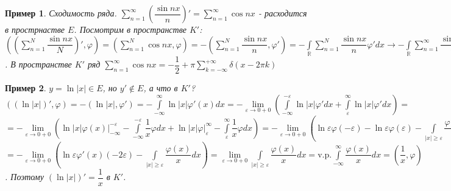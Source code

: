 \documentclass[9pt, a4paper]{article}
\newtheorem*{sample}{Пример}
\begin{document}
			\begin{sample}
				Сходимость ряда. \newline
				$\sum\limits_{n=1}^{\infty} \left(\dfrac{\sin{nx}}{n}\right)' = \sum\limits_{n=1}^{\infty}  \cos{nx}$ - расходится в прострнастве $E$. Посмотрим в пространстве $K'$: $\left(\left(\sum\limits_{n=1}^{N} \dfrac{\sin{nx}}{N}\right)', \varphi\right) = \left(\sum\limits_{n=1}^{N}  \cos{nx}, \varphi\right) = -(\sum\limits_{n=1}^N \dfrac{\sin{nx}}{n}, \varphi') = - \int\limits_{\mathbb{R}} \sum\limits_{n=1}^N \dfrac{\sin{nx}}{n} \varphi' dx  \to  - \int\limits_{\mathbb{R}} \sum\limits_{n=1}^\infty \dfrac{\sin{nx}}{n} \varphi' dx = -(f(x), \varphi'(x)) = (f'(x), \varphi)$. В пространстве $K'$ ряд $\sum\limits_{n=1}^{\infty} \cos{nx} = -\dfrac12 + \pi\sum\limits_{k=-\infty}^{+\infty} \delta(x - 2\pi k)$ 
			\end{sample}
			\begin{sample}
				$y = \ln{|x|} \in E$, но $y' \notin E$, а что в $K'$? \newline
				$((\ln{|x|})', \varphi) = -(\ln{|x|}, \varphi') = - \int\limits_{-\infty}^{\infty} \ln{|x|} \varphi'(x) dx = - \lim\limits_{\varepsilon \to 0 + 0} \left(\int\limits_{-\infty}^{-\varepsilon} \ln{|x|} \varphi' dx + \int\limits_{\varepsilon}^{\infty}  \ln{|x|} \varphi'dx \right) = $ \newline
				$=  - \lim\limits_{\varepsilon \to 0 + 0} \left(\ln{|x|}\varphi(x) \vert_{-\infty}^{-\varepsilon} - \int\limits_{-\infty}^{-\varepsilon} \dfrac{1}{x} \varphi dx + \ln{|x|}\varphi\vert_{\varepsilon}^{\infty} - \int\limits_{\varepsilon}^{\infty}  \dfrac{1}{x} \varphi dx \right) 
				=  - \lim\limits_{\varepsilon \to 0 + 0} \left(\ln{\varepsilon} \varphi(-\varepsilon) - \ln{\varepsilon}\varphi(\varepsilon) - \int\limits_{|x| \geq \varepsilon} \dfrac{\varphi(x)}{x} dx\right) = $ \newline
				$= - \lim\limits_{\varepsilon \to 0 + 0} \left(\ln{\varepsilon} \varphi'(x) \left(-2\varepsilon\right) - \int\limits_{|x| \geq \varepsilon} \dfrac{\varphi(x)}{x} dx\right) = \lim\limits_{\varepsilon \to 0 + 0} \int\limits_{|x| \geq \varepsilon} \dfrac{\varphi(x)}{x} dx = \mathrm{v.p.} \int\limits_{-\infty}^{\infty} \dfrac{\varphi(x)}{x}dx = (\dfrac{1}{x}, \varphi)$. Поэтому $(\ln{|x|})' = \dfrac{1}{x}$  в $K'$. 
			\end{sample}
\end{document}
